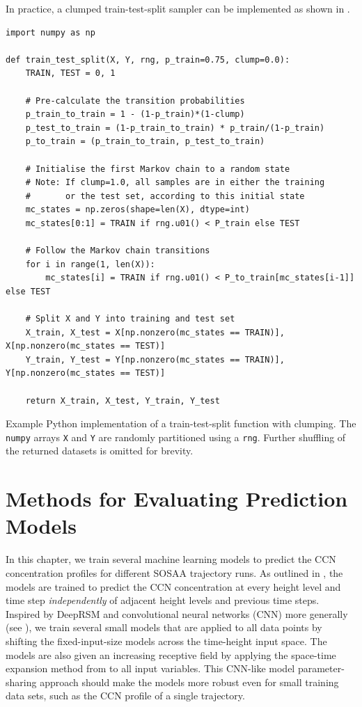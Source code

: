 \noindent In practice, a clumped train-test-split sampler can be implemented as shown in .

\begin{listing}[H]
    \capstart %
    \begin{verbatim}
import numpy as np
    
def train_test_split(X, Y, rng, p_train=0.75, clump=0.0):
    TRAIN, TEST = 0, 1

    # Pre-calculate the transition probabilities
    p_train_to_train = 1 - (1-p_train)*(1-clump)
    p_test_to_train = (1-p_train_to_train) * p_train/(1-p_train)
    p_to_train = (p_train_to_train, p_test_to_train)

    # Initialise the first Markov chain to a random state
    # Note: If clump=1.0, all samples are in either the training
    #       or the test set, according to this initial state
    mc_states = np.zeros(shape=len(X), dtype=int)
    mc_states[0:1] = TRAIN if rng.u01() < P_train else TEST

    # Follow the Markov chain transitions
    for i in range(1, len(X)):
        mc_states[i] = TRAIN if rng.u01() < P_to_train[mc_states[i-1]] else TEST

    # Split X and Y into training and test set
    X_train, X_test = X[np.nonzero(mc_states == TRAIN)], X[np.nonzero(mc_states == TEST)]
    Y_train, Y_test = Y[np.nonzero(mc_states == TRAIN)], Y[np.nonzero(mc_states == TEST)]

    return X_train, X_test, Y_train, Y_test
    \end{verbatim}
    \caption[Clumped train-test-split procedure]{Example Python implementation of a train-test-split function with clumping. The \texttt{numpy} arrays \texttt{X} and \texttt{Y} are randomly partitioned using a \texttt{rng}. Further shuffling of the returned datasets is omitted for brevity.}
    \label{exe:clumped-train-test}
\end{listing}

\section{Methods for Evaluating Prediction Models} \label{txt:model-criteria}

In this chapter, we train several machine learning models to predict the CCN concentration profiles for different SOSAA trajectory runs. As outlined in , the models are trained to predict the CCN concentration at every height level and time step \textit{independently} of adjacent height levels and previous time steps. Inspired by DeepRSM \cite{deep-rsm-2020} and convolutional neural networks (CNN) more generally (see ), we train several small models that are applied to all data points by shifting the fixed-input-size models across the time-height input space. The models are also given an increasing receptive field by applying the space-time expansion method from  to all input variables. This CNN-like model parameter-sharing approach should make the models more robust even for small training data sets, such as the CCN profile of a single trajectory.

